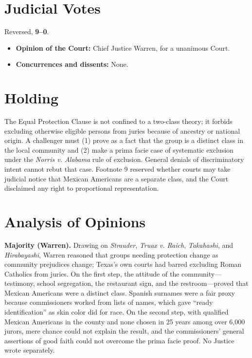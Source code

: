 \documentclass[12pt]{article}
\begin{document}
\section{Judicial Votes}

Reversed, \textbf{9--0}.
\begin{itemize}
\item \textbf{Opinion of the Court:} Chief Justice Warren, for a unanimous Court.
\item \textbf{Concurrences and dissents:} None.
\end{itemize}

\section{Holding}

The Equal Protection Clause is not confined to a two-class theory; it forbids excluding otherwise eligible persons from juries because of ancestry or national origin. A challenger must (1) prove as a fact that the group is a distinct class in the local community and (2) make a prima facie case of systematic exclusion under the \textit{Norris v. Alabama} rule of exclusion. General denials of discriminatory intent cannot rebut that case. Footnote 9 reserved whether courts may take judicial notice that Mexican Americans are a separate class, and the Court disclaimed any right to proportional representation.

\section{Analysis of Opinions}

\textbf{Majority (Warren).} Drawing on \textit{Strauder}, \textit{Truax v. Raich}, \textit{Takahashi}, and \textit{Hirabayashi}, Warren reasoned that groups needing protection change as community prejudices change; Texas's own courts had barred excluding Roman Catholics from juries. On the first step, the attitude of the community---testimony, school segregation, the restaurant sign, and the restroom---proved that Mexican Americans were a distinct class. Spanish surnames were a fair proxy because commissioners worked from lists of names, which gave ``ready identification'' as skin color did for race. On the second step, with qualified Mexican Americans in the county and none chosen in 25 years among over 6,000 jurors, mere chance could not explain the result, and the commissioners' general assertions of good faith could not overcome the prima facie proof. No Justice wrote separately.
\end{document}
